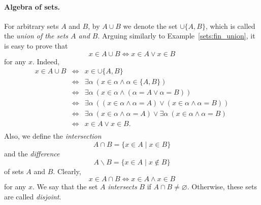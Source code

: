 \documentclass[12pt,notitlepage]{article}
\theoremstyle{plain}
\theoremstyle{definition}
\theoremstyle{plain}
\renewcommand{\setminus}{\smallsetminus}
\newcommand{\void}{\varnothing}
\newcommand{\1}{\mathbf{1}}
\newcommand{\0}{\mathbf{0}}
\begin{document}
\paragraph{Algebra of sets.} For arbitrary sets $A$ and $B$, by $A \cup B$ we denote the set $\cup\{A, B\}$, which is called the \emph{union of the sets $A$ and $B$}. Arguing similarly to Example~\ref{sets:fin_union}, it is easy to prove that
$$x \in A \cup B \iff x \in A \vee x \in B$$
for any $x$. Indeed,
$$
\begin{array}{rcl}
x \in A \cup B &\iff& x \in \cup\{ A, B \}\\
		&\iff&  \exists \alpha\ (x \in \alpha \wedge \alpha \in \{A, B\})\\
		&\iff& \exists \alpha\ (x \in \alpha \wedge (\alpha = A \vee \alpha = B))\\
		&\iff& \exists \alpha\ ((x \in \alpha \wedge \alpha = A) \vee (x \in \alpha \wedge \alpha = B) )\\
		&\iff& \exists \alpha\ (x \in \alpha \wedge \alpha = A) \vee \exists \alpha\ (x \in \alpha \wedge \alpha = B)\\
		&\iff& x \in A  \vee   x \in B.\\
\end{array}
$$
\noindent Also, we define the \emph{intersection}
$$A \cap B = \{ x\in A \mid x \in B\}$$
and the \emph{difference}
$$A \setminus B = \{x \in A \mid x \notin B\}$$
of sets $A$ and $B$. Clearly,
$$x \in A \cap B \iff x \in A \wedge x \in B$$
for any $x$. We say that the set $A$ \emph{intersects} $B$ if $A \cap B \neq \void$. Otherwise, these sets are called \emph{disjoint}.
 
\end{document}
